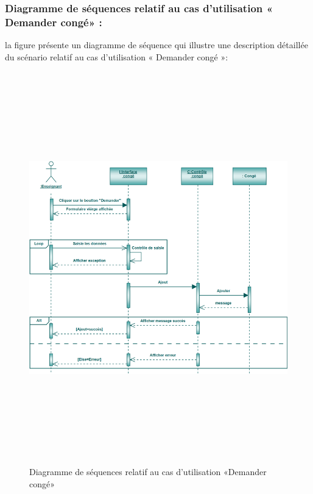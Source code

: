 \documentclass[12 pt]{report}
\begin{document}
\subsubsection{Diagramme de séquences relatif au cas d’utilisation « Demander congé» :}
la figure   présente un diagramme de séquence qui illustre une description détaillée du scénario relatif au cas d’utilisation « Demander congé »: 
\begin{figure}[h]
 \begin{center}
\includegraphics[width= 18 cm ,height=  17cm]{sdc.PNG}
\caption{Diagramme de séquences relatif au cas d’utilisation «Demander congé»}

\end{center}
\end{figure}
\end{document}
